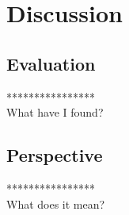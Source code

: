 \label{chapter-discussion}
\chapter{Discussion}

\section{Evaluation}

****************\\
What have I found?\\

\section{Perspective}

****************\\
What does it mean?\\

